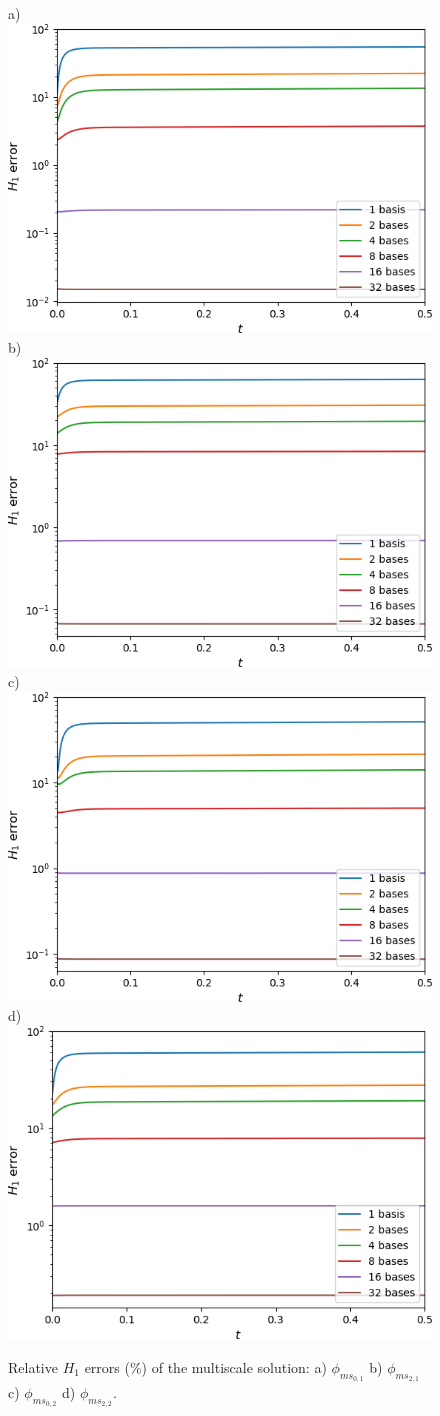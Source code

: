 \documentclass[preprint]{elsarticle}
\begin{document}
\begin{figure}[ht]
	\centering
		a)\includegraphics[width=0.45\linewidth]{twigl/H1_u1.png} 
		b)\includegraphics[width=0.45\linewidth]{twigl/H1_u2.png} 
		c)\includegraphics[width=0.45\linewidth]{twigl/H1_u3.png} 
		d)\includegraphics[width=0.45\linewidth]{twigl/H1_u4.png} 
	\caption{Relative $H_1$ errors ($\%$) of the multiscale solution: a) $\phi_{ms_{0, 1}}$ b) $\phi_{ms_{2, 1}}$ c) $\phi_{ms_{0, 2}}$ d) $\phi_{ms_{2, 2}}$.}
	\label{twigl_H1}
\end{figure}

\end{document}
